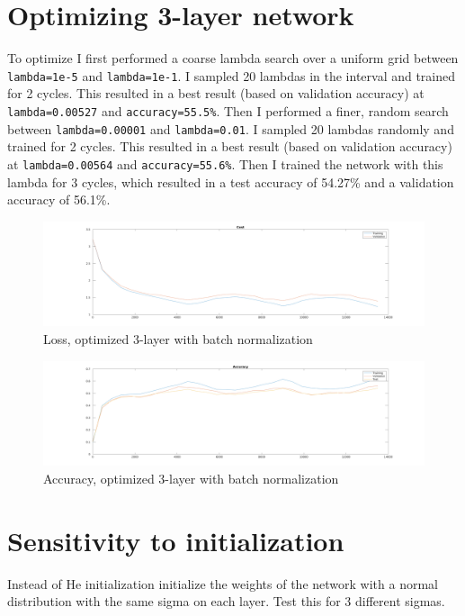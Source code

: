 \section{Optimizing 3-layer network}
To optimize I first performed a coarse lambda search over a uniform grid between \texttt{lambda=1e-5} and \texttt{lambda=1e-1}.
I sampled 20 lambdas in the interval and trained for 2 cycles.
This resulted in a best result (based on validation accuracy) at \texttt{lambda=0.00527} and \texttt{accuracy=55.5\%}. 
Then I performed a finer, random search between \texttt{lambda=0.00001} and \texttt{lambda=0.01}.
I sampled 20 lambdas randomly and trained for 2 cycles.
This resulted in a best result (based on validation accuracy) at \texttt{lambda=0.00564} and \texttt{accuracy=55.6\%}.
Then I trained the network with this lambda for 3 cycles, which resulted in a test accuracy of 54.27\% and
a validation accuracy of 56.1\%.
\begin{figure}[ht]
    \includegraphics[width=\textwidth]{../code/result_pics/cost_lambda=0.00564_ns=2250_cycles=3_k=3_bn=1.png}
    \caption{Loss, optimized 3-layer with batch normalization}
\end{figure}
\begin{figure}[ht]
    \includegraphics[width=\textwidth]{../code/result_pics/accuracy_lambda=0.00564_ns=2250_cycles=3_k=3_bn=1.png}
    \caption{Accuracy, optimized 3-layer with batch normalization}
\end{figure}
\clearpage

\section{Sensitivity to initialization}
Instead of He initialization initialize the weights of the network with a normal distribution with the same sigma on each layer.
Test this for 3 different sigmas.
